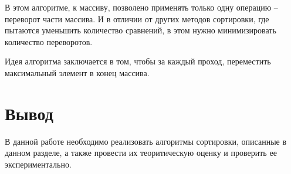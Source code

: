 В этом алгоритме, к массиву, позволено применять только одну операцию – переворот части массива. И в отличии от других методов сортировки, где пытаются уменьшить количество сравнений, в этом нужно минимизировать количество переворотов.

Идея алгоритма заключается в том, чтобы за каждый проход, переместить максимальный элемент в конец массива.

\section*{Вывод}

В данной работе необходимо реализовать алгоритмы сортировки, описанные в данном разделе, 
а также провести их теоритическую оценку и проверить ее экспериментально.
